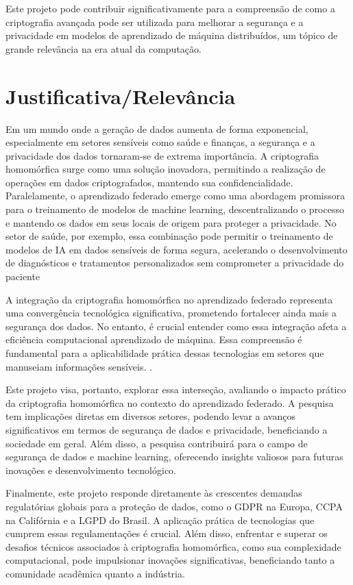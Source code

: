 \documentclass{article}
\begin{document}
Este projeto pode contribuir significativamente para a compreensão de como a criptografia avançada pode ser utilizada para melhorar a segurança e a privacidade em modelos de aprendizado de máquina distribuídos, um tópico de grande relevância na era atual da computação.
   
\section{Justificativa/Relevância}

Em um mundo onde a geração de dados aumenta de forma exponencial, especialmente em setores sensíveis como saúde e finanças, a segurança e a privacidade dos dados tornaram-se de extrema importância. A criptografia homomórfica surge como uma solução inovadora, permitindo a realização de operações em dados criptografados, mantendo sua confidencialidade. Paralelamente, o aprendizado federado emerge como uma abordagem promissora para o treinamento de modelos de machine learning, descentralizando o processo e mantendo os dados em seus locais de origem para proteger a privacidade. No setor de saúde, por exemplo, essa combinação pode permitir o treinamento de modelos de IA em dados sensíveis de forma segura, acelerando o desenvolvimento de diagnósticos e tratamentos personalizados sem comprometer a privacidade do paciente

A integração da criptografia homomórfica no aprendizado federado representa uma convergência tecnológica significativa, prometendo fortalecer ainda mais a segurança dos dados. No entanto, é crucial entender como essa integração afeta a eficiência computacional aprendizado de máquina. Essa compreensão é fundamental para a aplicabilidade prática dessas tecnologias em setores que manuseiam informações sensíveis.  .

Este projeto visa, portanto, explorar essa interseção, avaliando o impacto prático da criptografia homomórfica no contexto do aprendizado federado. A pesquisa tem implicações diretas em diversos setores, podendo levar a avanços significativos em termos de segurança de dados e privacidade, beneficiando a sociedade em geral. Além disso, a pesquisa contribuirá para o campo de segurança de dados e machine learning, oferecendo insights valiosos para futuras inovações e desenvolvimento tecnológico.

Finalmente, este projeto responde diretamente às crescentes demandas regulatórias globais para a proteção de dados, como o GDPR na Europa, CCPA na Califórnia e a LGPD do Brasil. A aplicação prática de tecnologias que cumprem essas regulamentações é crucial. Além disso, enfrentar e superar os desafios técnicos associados à criptografia homomórfica, como sua complexidade computacional, pode impulsionar inovações significativas, beneficiando tanto a comunidade acadêmica quanto a indústria. 
\end{document}
